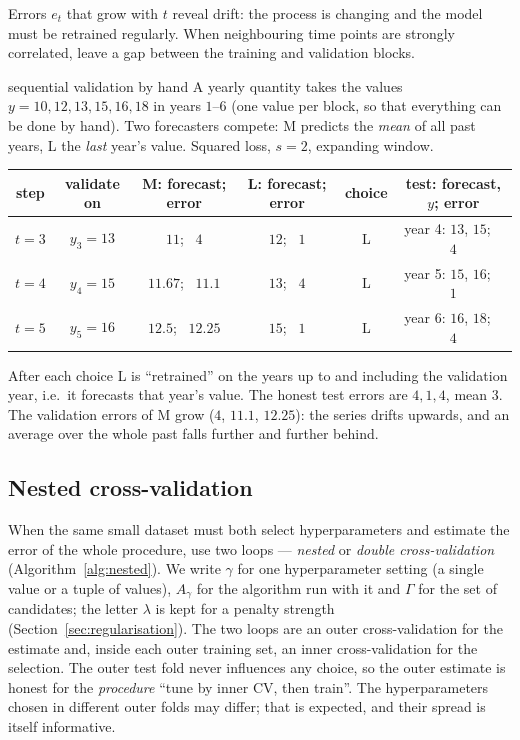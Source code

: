 \documentclass[11pt]{article}
\begin{document}
Errors $e_t$ that grow with $t$ reveal drift: the process is changing and the model must be retrained regularly. When
neighbouring time points are strongly correlated, leave a gap between the training and validation blocks.

\begin{worked}{sequential validation by hand}
A yearly quantity takes the values $y = 10, 12, 13, 15, 16, 18$ in years $1$--$6$ (one value per block, so that
everything can be done by hand). Two forecasters compete: M predicts the \emph{mean} of all past years, L the
\emph{last} year's value. Squared loss, $s = 2$, expanding window.
\begin{center}\small
\begin{tabular}{@{}cccccc@{}}
\toprule
step & validate on & M: forecast; error & L: forecast; error & choice & test: forecast, $y$; error \\
\midrule
$t = 3$ & $y_3 = 13$ & $11$; \ $4$ & $12$; \ $1$ & L & year 4: $13$, $15$; \ $4$ \\
$t = 4$ & $y_4 = 15$ & $11.67$; \ $11.1$ & $13$; \ $4$ & L & year 5: $15$, $16$; \ $1$ \\
$t = 5$ & $y_5 = 16$ & $12.5$; \ $12.25$ & $15$; \ $1$ & L & year 6: $16$, $18$; \ $4$ \\
\bottomrule
\end{tabular}
\end{center}
After each choice L is ``retrained'' on the years up to and including the validation year, i.e.\ it forecasts that
year's value. The honest test errors are $4, 1, 4$, mean $3$. The validation errors of M grow ($4$, $11.1$, $12.25$):
the series drifts upwards, and an average over the whole past falls further and further behind.
\end{worked}

\subsection{Nested cross-validation}

When the same small dataset must both select hyperparameters and estimate the error of the whole procedure, use two
loops --- \emph{nested} or \emph{double cross-validation} (Algorithm~\ref{alg:nested}). We write $\gamma$ for one
hyperparameter setting (a single value or a tuple of values), $A_\gamma$ for the algorithm run with it and $\Gamma$
for the set of candidates; the letter $\lambda$ is kept for a penalty strength (Section~\ref{sec:regularisation}).
The two loops are an outer cross-validation for the estimate and, inside each outer training set, an
inner cross-validation for the selection. The outer test fold never influences any choice, so the outer estimate is
honest for the \emph{procedure} ``tune by inner CV, then train''. The hyperparameters chosen in different outer
folds may differ; that is expected, and their spread is itself informative.
\end{document}
